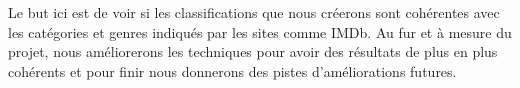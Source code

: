 Le but ici est de voir si les classifications que nous créerons sont cohérentes avec les catégories et genres indiqués par les sites comme IMDb. Au fur et à mesure du projet, nous améliorerons les techniques pour avoir des résultats de plus en plus cohérents et pour finir nous donnerons des pistes d'améliorations futures.

